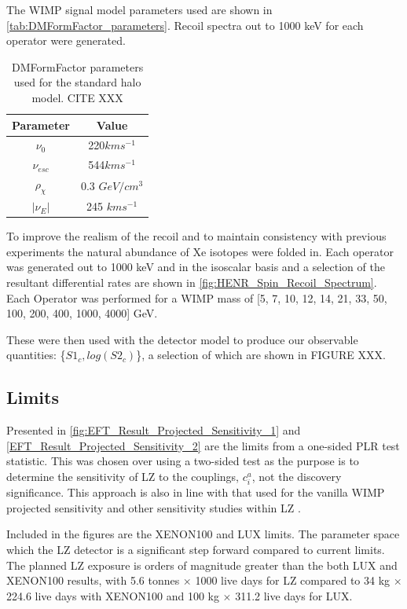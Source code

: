 The WIMP signal model parameters used are shown in \autoref{tab:DMFormFactor_parameters}.
Recoil spectra out to 1000 keV for each operator were generated.

\begin{table}[]
    \centering
    \begin{tabular}{c|c}
        Parameter         & Value  \\ \hline
        $\nu_0$           & 220$km s^{-1}$ \\
        $\nu_{esc}$       & 544$km s^{-1}$ \\
        $\rho_{\chi}$     & 0.3 $GeV/cm^{3}$ \\
        $|\nu_E|$         & 245 $km s^{-1}$ 
    \end{tabular}
    \caption{DMFormFactor parameters used for the standard halo model. CITE XXX}
    \label{tab:DMFormFactor_parameters}
\end{table}
To improve the realism of the recoil and to maintain consistency with previous experiments the natural abundance of Xe isotopes were folded in.
Each operator was generated out to 1000 keV and in the isoscalar basis and a selection of the resultant differential rates are shown in \autoref{fig:HENR_Spin_Recoil_Spectrum}.
Each Operator was performed for a WIMP mass of [5, 7, 10, 12, 14, 21, 33, 50, 100, 200, 400, 1000, 4000] GeV.


\par
These were then used with the detector model to produce our observable quantities: \{$S1_c,log(S2_c)$\}, a selection of which are shown in FIGURE XXX.

%


\subsection{Limits}
\par
Presented in \autoref{fig:EFT_Result_Projected_Sensitivity_1} and \autoref{EFT_Result_Projected_Sensitivity_2} are the limits from a one-sided PLR test statistic.
This was chosen over using a two-sided test as the purpose is to determine the sensitivity of LZ to the couplings, $c^{a}_i$, not the discovery significance. 
This approach is also in line with that used for the vanilla WIMP projected sensitivity \cite{LZ_projected_sensitivity_paper_ref} and other sensitivity studies within LZ \cite{LZ_Ibles_LZStats_Thesis_ref, umituktu_thesis_ref}.
\par
Included in the figures are the XENON100 \cite{xenon100_eft_ref} and LUX \cite{LUX_RUN4_EFT_2021} limits.
The parameter space which the LZ detector is a significant step forward compared to current limits.
The planned LZ exposure is orders of magnitude greater than the both LUX and XENON100 results, with 5.6 tonnes $\times$ 1000 live days for LZ compared to 34 kg $\times$ 224.6 live days with XENON100 and 100 kg $\times$ 311.2 live days for LUX.

